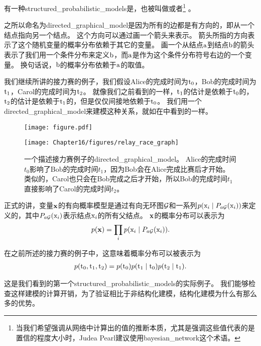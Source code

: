 有一种\gls{structured_probabilistic_models}是，也被叫做或者\footnote{当我们希望强调从网络中计算出的值的推断本质，尤其是强调这些值代表的是置信的程度大小时，Judea Pearl建议使用\gls{bayesian_network}这个术语。} \citep{pearl85bayesian}。


之所以命名为\gls{directed_graphical_model}是因为所有的边都是有方向的，即从一个结点指向另一个结点。
这个方向可以通过画一个箭头来表示。
箭头所指的方向表示了这个随机变量的概率分布依赖于其它的变量。
画一个从结点$\mathrm{a}$到结点$\mathrm{b}$的箭头表示了我们用一个条件分布来定义$\mathrm{b}$，而$\mathrm{a}$是作为这个条件分布符号右边的一个变量。
换句话说，$\mathrm{b}$的概率分布依赖于$\mathrm{a}$的取值。


我们继续所讲的接力赛的例子，我们假设Alice的完成时间为$\mathrm{t}_0$，Bob的完成时间为$\mathrm{t}_1$，Carol的完成时间为$\mathrm{t}_2$。
就像我们之前看到的一样，$\mathrm{t}_1$的估计是依赖于$\mathrm{t}_0$的，$\mathrm{t}_2$的估计是依赖于$\mathrm{t}_1$的，但是仅仅间接地依赖于$\mathrm{t}_0$。
我们用一个\gls{directed_graphical_model}来建模这种关系，就如在中看到的一样。

\begin{figure}[!htb]
\ifOpenSource
\centerline{\texttt{[image: figure.pdf]}}
\else
	\centerline{\texttt{[image: Chapter16/figures/relay\_race\_graph]}}	
\fi
	\caption{一个描述接力赛例子的\gls{directed_graphical_model}。
Alice的完成时间$t_0$影响了Bob的完成时间$t_1$，因为Bob会在Alice完成比赛后才开始。
类似的，Carol也只会在Bob完成之后才开始，所以Bob的完成时间$t_1$直接影响了Carol的完成时间$t_2$。}
	\label{fig:relay_race_graph}
\end{figure}


正式的讲，变量$\mathbf{x}$的有向概率模型是通过有向无环图$\mathcal{G}$和一系列$p(\mathrm{x}_i\mid P_{a\mathcal{G}}(\mathrm{x}_i))$来定义的，其中$P_{a\mathcal{G}}(\mathrm{x}_i)$表示结点$\mathrm{x}_i$的所有父结点。
$\mathbf{x}$的概率分布可以表示为
\begin{align}
\label{eqn:161}
p(\mathbf{x}) = \prod_{i} p(\mathrm{x}_i\mid P_{a\mathcal{G}}(\mathrm{x}_i)).
\end{align}


在之前所述的接力赛的例子中，这意味着概率分布可以被表示为
\begin{align}
\label{eqn:162}
p(\mathrm{t}_0,\mathrm{t}_1,\mathrm{t}_2) = p(\mathrm{t}_0)p(\mathrm{t}_1\mid \mathrm{t}_0)p(\mathrm{t}_2\mid \mathrm{t}_1).
\end{align}


这是我们看到的第一个\gls{structured_probabilistic_models}的实际例子。
我们能够检查这样建模的计算开销，为了验证相比于非结构化建模，结构化建模为什么有那么多的优势。



